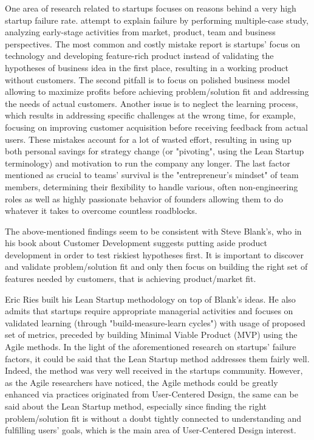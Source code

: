 \documentclass{article}
\begin{document}
One area of research related to startups focuses on reasons behind a very high startup failure rate. \cite{giardino2014early} attempt to explain failure by performing multiple-case study, analyzing early-stage activities from market, product, team and business perspectives. The most common and costly mistake \citeauthor{giardino2014early} report is startups' focus on technology and developing feature-rich product instead of validating the hypotheses of business idea in the first place, resulting in a working product without customers. The second pitfall is to focus on polished business model allowing to maximize profits before achieving problem/solution fit and addressing the needs of actual customers. Another issue is to neglect the learning process, which results in addressing specific challenges at the wrong time, for example, focusing on improving customer acquisition before receiving feedback from actual users. These mistakes account for a lot of wasted effort, resulting in using up both personal savings for strategy change (or "pivoting", using the Lean Startup terminology) and motivation to run the company any longer. The last factor mentioned as crucial to teams' survival is the "entrepreneur's mindset" of team members, determining their flexibility to handle various, often non-engineering roles as well as highly passionate behavior of founders allowing them to do whatever it takes to overcome countless roadblocks.

The above-mentioned findings seem to be consistent with Steve Blank's, who in his book about Customer Development \citep{blank2013four} suggests putting aside product development in order to test riskiest hypotheses first. It is important to discover and validate problem/solution fit and only then focus on building the right set of features needed by customers, that is achieving product/market fit.

Eric Ries built his Lean Startup methodology \citep{ries2011lean} on top of Blank's ideas. He also admits that startups require appropriate managerial activities and focuses on validated learning (through "build-measure-learn cycles") with usage of proposed set of metrics, preceded by building Minimal Viable Product (MVP) using the Agile methods. In the light of the aforementioned research on startups' failure factors, it could be said that the Lean Startup method addresses them fairly well. Indeed, the method was very well received in the startups community. However, as the Agile researchers have noticed, the Agile methods could be greatly enhanced via practices originated from User-Centered Design, the same can be said about the Lean Startup method, especially since finding the right problem/solution fit is without a doubt tightly connected to understanding and fulfilling users' goals, which is the main area of User-Centered Design interest.
\end{document}
